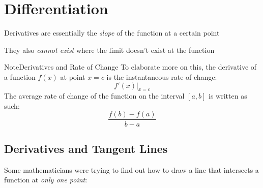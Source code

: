 \documentclass{MathNotes}
\newenvironment{note}[1]
{\begin{YellowBox}{Note}{#1}}{\end{YellowBox}}
\begin{document}
\newpage
\section{Differentiation}
Derivatives are essentially the \textit{slope} of the function at a
certain point

They also \textit{cannot exist} where the limit doesn't exist at the 
function

\begin{note}{Derivatives and Rate of Change}
To elaborate more on this, the derivative of a function $f(x)$ at point $x=c$
is the instantaneous rate of change: $$f'(x)\Big|_{x=c}$$ The average rate of
change of the function on the interval $[a, b]$ is written as such:
$$\frac{f(b)-f(a)}{b-a}$$
\end{note}

\subsection{Derivatives and Tangent Lines}
Some mathematicians were trying to find out how to draw a line that intersects 
a function at \textit{only one point}:

\begin{center}
\end{center}
\end{document}
